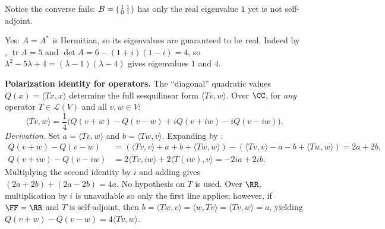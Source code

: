 \documentclass[10pt]{scrartcl}
\DeclareMathOperator{\tr}{tr}\DeclareMathOperator{\nul}{null}\DeclareMathOperator{\range}{range}\DeclareMathOperator{\spn}{span}
\newcommand{\LL}{\mathcal L}\newcommand{\PP}{\mathcal P}\newcommand{\MM}{\mathcal M}
\begin{document}
Notice the converse fails: $B=\begin{psmallmatrix}1&1\\0&1\end{psmallmatrix}$ has only the real eigenvalue $1$ yet is not self-adjoint.

\revisit Yes: $A=A^*$ is Hermitian, so its eigenvalues are guaranteed to be real. Indeed by , $\tr A=5$ and $\det A=6-(1+i)(1-i)=4$, so $\lambda^2-5\lambda+4=(\lambda-1)(\lambda-4)$ gives eigenvalues $1$ and $4$.

\medskip\noindent\textbf{Polarization identity for operators.} The ``diagonal'' quadratic values $Q(x)=\langle Tx,x\rangle$ determine the full sesquilinear form $\langle Tv,w\rangle$. Over $\CC$, for \emph{any} operator $T\in\LL(V)$ and all $v,w\in V$:
\[
  \langle Tv,w\rangle = \frac{1}{4}\bigl(Q(v+w)-Q(v-w)+iQ(v+iw)-iQ(v-iw)\bigr).
\]
\emph{Derivation.} Set $a=\langle Tv,w\rangle$ and $b=\langle Tw,v\rangle$. Expanding by :
\begin{align*}
  Q(v+w)-Q(v-w) &= (\langle Tv,v\rangle + a + b + \langle Tw,w\rangle) - (\langle Tv,v\rangle - a - b + \langle Tw,w\rangle) = 2a+2b,\\
  Q(v+iw)-Q(v-iw) &= 2\langle Tv,iw\rangle + 2\langle T(iw),v\rangle = -2ia+2ib.
\end{align*}
Multiplying the second identity by $i$ and adding gives $(2a+2b)+(2a-2b)=4a$. No hypothesis on $T$ is used. Over $\RR$, multiplication by $i$ is unavailable so only the first line applies; however, if $\FF=\RR$ and $T$ is self-adjoint, then $b=\langle Tw,v\rangle=\langle w,Tv\rangle=\langle Tv,w\rangle=a$, yielding $Q(v+w)-Q(v-w)=4\langle Tv,w\rangle$.
\end{document}
